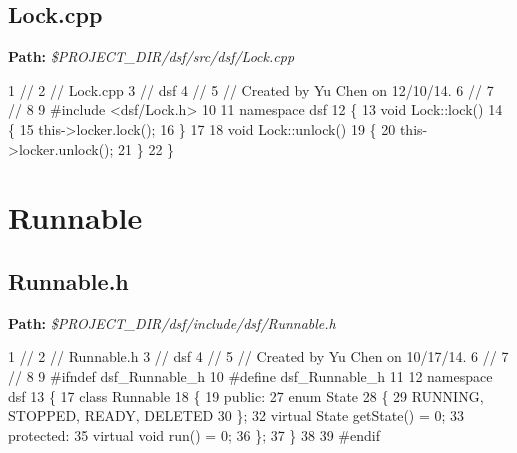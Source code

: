  \hypertarget{_dual_state_framework_DualStateFrameworkLock_cpp}{}\subsection{Lock.\+cpp}\label{_dual_state_framework_DualStateFrameworkLock_cpp}
{\bfseries Path\+:} {\itshape \$\+P\+R\+O\+J\+E\+C\+T\+\_\+\+D\+I\+R/dsf/src/dsf/\+Lock.cpp} 
\begin{DoxyCodeInclude}
1 \textcolor{comment}{//}
2 \textcolor{comment}{//  Lock.cpp}
3 \textcolor{comment}{//  dsf}
4 \textcolor{comment}{//}
5 \textcolor{comment}{//  Created by Yu Chen on 12/10/14.}
6 \textcolor{comment}{//}
7 \textcolor{comment}{//}
8 
9 \textcolor{preprocessor}{#include <dsf/Lock.h>}
10 
11 \textcolor{keyword}{namespace }dsf
12 \{
13     \textcolor{keywordtype}{void} Lock::lock()
14     \{
15         this->locker.lock();
16     \}
17     
18     \textcolor{keywordtype}{void} Lock::unlock()
19     \{
20         this->locker.unlock();
21     \}
22 \}
\end{DoxyCodeInclude}
 \hypertarget{_dual_state_framework_DualStateFrameworkRunnable}{}\section{Runnable}\label{_dual_state_framework_DualStateFrameworkRunnable}
\hypertarget{_dual_state_framework_DualStateFrameworkRunnable_h}{}\subsection{Runnable.\+h}\label{_dual_state_framework_DualStateFrameworkRunnable_h}
{\bfseries Path\+:} {\itshape \$\+P\+R\+O\+J\+E\+C\+T\+\_\+\+D\+I\+R/dsf/include/dsf/\+Runnable.h} 
\begin{DoxyCodeInclude}
1 \textcolor{comment}{//}
2 \textcolor{comment}{//  Runnable.h}
3 \textcolor{comment}{//  dsf}
4 \textcolor{comment}{//}
5 \textcolor{comment}{//  Created by Yu Chen on 10/17/14.}
6 \textcolor{comment}{//}
7 \textcolor{comment}{//}
8 
9 \textcolor{preprocessor}{#ifndef dsf\_Runnable\_h}
10 \textcolor{preprocessor}{#define dsf\_Runnable\_h}
11 
12 \textcolor{keyword}{namespace }dsf
13 \{
17     \textcolor{keyword}{class }Runnable
18     \{
19     \textcolor{keyword}{public}:
27         \textcolor{keyword}{enum} State
28         \{
29             RUNNING, STOPPED, READY, DELETED
30         \};
32         \textcolor{keyword}{virtual} State getState() = 0;
33     \textcolor{keyword}{protected}:
35         \textcolor{keyword}{virtual} \textcolor{keywordtype}{void} run() = 0;
36     \};
37 \}
38 
39 \textcolor{preprocessor}{#endif}
\end{DoxyCodeInclude}
